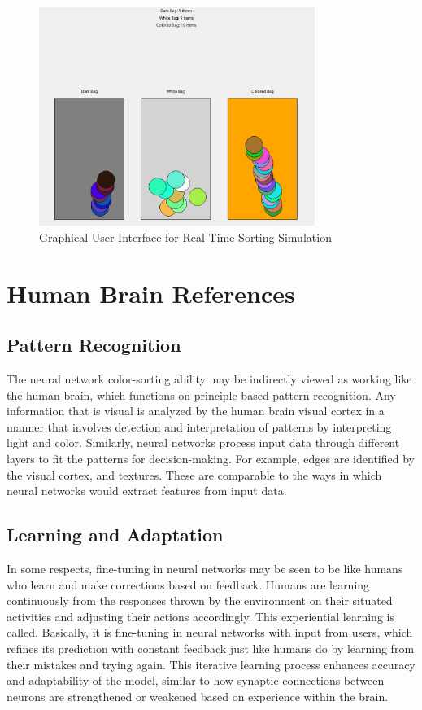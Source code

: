 \documentclass{article}
\begin{document}
\begin{figure}[H]
\centering
\includegraphics[width=0.8\textwidth]{pictures/gui_example.png}
\caption{Graphical User Interface for Real-Time Sorting Simulation}
\label{fig
}
\end{figure}
\newpage

\section{Human Brain References}

\subsection{Pattern Recognition}
The neural network color-sorting ability may be indirectly viewed as working like the human brain, which functions on principle-based pattern recognition. Any information that is visual is analyzed by the human brain visual cortex in a manner that involves detection and interpretation of patterns by interpreting light and color. Similarly, neural networks process input data through different layers to fit the patterns for decision-making. For example, edges are identified by the visual cortex, and textures. These are comparable to the ways in which neural networks would extract features from input data.
\subsection{Learning and Adaptation}
In some respects, fine-tuning in neural networks may be seen to be like humans who learn and make corrections based on feedback. Humans are learning continuously from the responses thrown by the environment on their situated activities and adjusting their actions accordingly. This experiential learning is called. Basically, it is fine-tuning in neural networks with input from users, which refines its prediction with constant feedback just like humans do by learning from their mistakes and trying again. This iterative learning process enhances accuracy and adaptability of the model, similar to how synaptic connections between neurons are strengthened or weakened based on experience within the brain.
\end{document}
